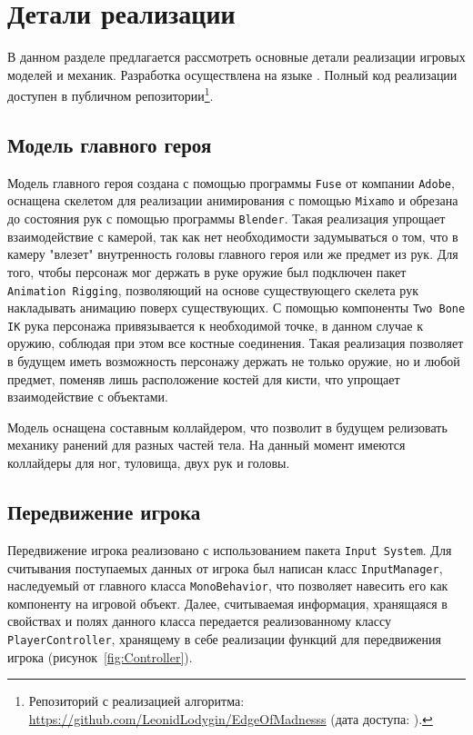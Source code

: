 
\section{Детали реализации}
В данном разделе предлагается рассмотреть основные детали реализации игровых моделей и механик. Разработка осуществлена на языке \csharp. Полный код реализации доступен в публичном репозитории\footnote{Репозиторий с реализацией алгоритма: \url{https://github.com/LeonidLodygin/EdgeOfMadnesss} (дата доступа:   ).}.

\subsection{Модель главного героя}
Модель главного героя создана с помощью программы \texttt{Fuse} от компании \texttt{Adobe}, оснащена скелетом для реализации анимирования с помощью \texttt{Mixamo} и обрезана до состояния рук с помощью программы \texttt{Blender}. Такая реализация упрощает взаимодействие с камерой, так как нет необходимости задумываться о том, что в камеру "влезет" внутренность головы главного героя или же предмет из рук. Для того, чтобы персонаж мог держать в руке оружие был подключен пакет \texttt{Animation Rigging}, позволяющий на основе существующего скелета рук накладывать анимацию поверх существующих. С помощью компоненты \texttt{Two Bone IK} рука персонажа привязывается к необходимой точке, в данном случае к оружию, соблюдая при этом все костные соединения. Такая реализация позволяет в будущем иметь возможность персонажу держать не только оружие, но и любой предмет, поменяв лишь расположение костей для кисти, что упрощает взаимодействие с объектами.

Модель оснащена составным коллайдером, что позволит в будущем релизовать механику ранений для разных частей тела. На данный момент имеются коллайдеры для ног, туловища, двух рук и головы.

\subsection{Передвижение игрока}
Передвижение игрока реализовано с использованием пакета \texttt{Input System}. Для считывания поступаемых данных от игрока был написан класс \texttt{InputManager}, наследуемый от главного класса \texttt{MonoBehavior}, что позволяет навесить его как компоненту на игровой объект. Далее, считываемая информация, хранящаяся в свойствах и полях данного класса передается реализованному классу \texttt{PlayerController}, хранящему в себе реализации функций для передвижения игрока (рисунок~\ref{fig:Controller}).


